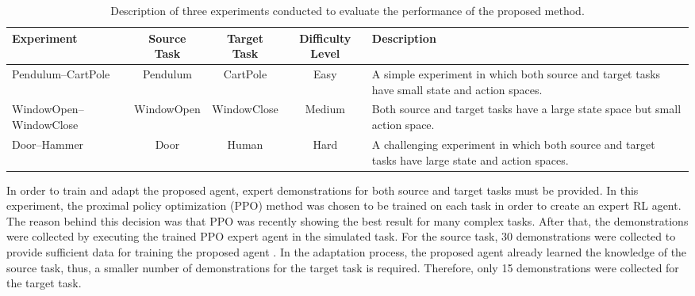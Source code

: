\begin{landscape}
  \begin{table}[H]
    \centering
    \caption{Description of three experiments conducted to evaluate the performance of the proposed method.\label{tab:Experiments}}

    \begin{tabular}{lcccp{5.5cm}}
      \toprule
      \textbf{Experiment}     & \textbf{Source Task} & \textbf{Target Task}                                                                               & \textbf{Difficulty Level} & \textbf{Description} \\
      \midrule
      Pendulum--CartPole      & Pendulum             & CartPole
                              & Easy                 & A simple experiment in which both source and target tasks have small state and action spaces.                                                         \\
      WindowOpen--WindowClose & WindowOpen           & WindowClose
                              & Medium               & Both source and target tasks have a large state space but small action space.                                                                         \\
      Door--Hammer            & Door                 & Human
                              & Hard                 & A challenging experiment in which both source and target tasks have large state and action spaces.                                                    \\
      \bottomrule
    \end{tabular}
  \end{table}
\end{landscape}

In order to train and adapt the proposed \TAIL{} agent,
expert demonstrations for both source and target tasks must be provided.
In this experiment,
the proximal policy optimization (PPO) method was chosen to be trained on each task in order to create an expert RL agent.
The reason behind this decision was that PPO was recently showing the best result for many complex tasks.
After that,
the demonstrations were collected by executing the trained PPO expert agent in the simulated task.
For the source task, 30 demonstrations were collected to provide sufficient data for training the proposed agent \cite{IL_Model_GAIL}.
In the adaptation process, the proposed agent already learned the knowledge of the source task, thus, a smaller number of demonstrations for the target task is required.
Therefore, only 15 demonstrations were collected for the target task.


